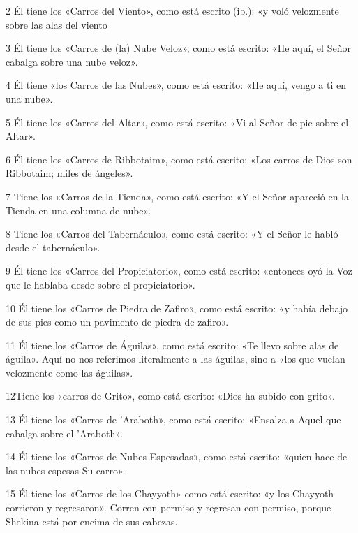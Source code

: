 \par 2 Él tiene los «Carros del Viento», como está escrito (ib.): «y voló velozmente sobre las alas del viento

\par 3 Él tiene los «Carros de (la) Nube Veloz», como está escrito: «He aquí, el Señor cabalga sobre una nube veloz».

\par 4 Él tiene «los Carros de las Nubes», como está escrito: «He aquí, vengo a ti en una nube».

\par 5 Él tiene los «Carros del Altar», como está escrito: «Vi al Señor de pie sobre el Altar».

\par 6 Él tiene los «Carros de Ribbotaim», como está escrito: «Los carros de Dios son Ribbotaim; miles de ángeles».

\par 7 Tiene los «Carros de la Tienda», como está escrito: «Y el Señor apareció en la Tienda en una columna de nube».

\par 8 Tiene los «Carros del Tabernáculo», como está escrito: «Y el Señor le habló desde el tabernáculo».

\par 9 Él tiene los «Carros del Propiciatorio», como está escrito: «entonces oyó la Voz que le hablaba desde sobre el propiciatorio».

\par 10 Él tiene los «Carros de Piedra de Zafiro», como está escrito: «y había debajo de sus pies como un pavimento de piedra de zafiro».

\par 11 Él tiene los «Carros de Águilas», como está escrito: «Te llevo sobre alas de águila». Aquí no nos referimos literalmente a las águilas, sino a «los que vuelan velozmente como las águilas».

\par 12Tiene los «carros de Grito», como está escrito: «Dios ha subido con grito».

\par 13 Él tiene los «Carros de 'Araboth», como está escrito: «Ensalza a Aquel que cabalga sobre el 'Araboth».

\par 14 Él tiene los «Carros de Nubes Espesadas», como está escrito: «quien hace de las nubes espesas Su carro».

\par 15 Él tiene los «Carros de los Chayyoth» como está escrito: «y los Chayyoth corrieron y regresaron». Corren con permiso y regresan con permiso, porque Shekina está por encima de sus cabezas.

